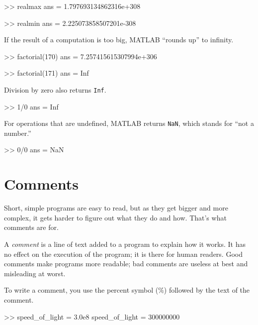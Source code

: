 
\begin{code}
>> realmax
ans = 1.797693134862316e+308

>> realmin
ans = 2.225073858507201e-308
\end{code}

If the result of a computation is too big, MATLAB ``rounds up''
to \mbox{infinity}.


\begin{code}
>> factorial(170)
ans = 7.257415615307994e+306

>> factorial(171)
ans = Inf
\end{code}

Division by zero also returns \lstinline{Inf}.

\begin{code}
>> 1/0
ans = Inf
\end{code}


For operations that are undefined, MATLAB returns \lstinline{NaN},
which stands for ``not a number.''


\begin{code}
>> 0/0
ans = NaN
\end{code}


\section{Comments}

Short, simple programs are easy to read, but as they get bigger and more complex, it gets harder to figure out what they do and how.  That's what comments are for.

A \emph{comment} is a line of text added to a program to explain how it works. It has no effect on the execution of the program; it is there for human readers.
Good comments make programs more readable; bad comments are useless at best and misleading at worst.

To write a comment, you use the percent symbol (\%) followed by the text of the comment.


\begin{code}
>> speed_of_light = 3.0e8     %
speed_of_light = 300000000
\end{code}

